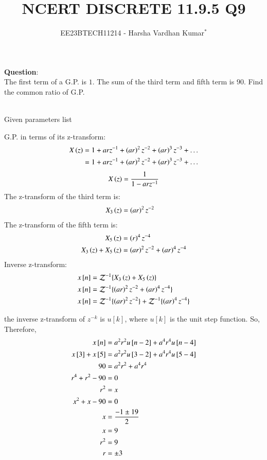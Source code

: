 \documentclass[journal,12pt,twocolumn]{IEEEtran}
\theoremstyle{remark}
\begin{document}

\vspace{3cm}
\title{NCERT DISCRETE 11.9.5 Q9}
\author{EE23BTECH11214 - Harsha Vardhan Kumar$^{*}$%
}
\maketitle
\newpage
\bigskip
\textbf{Question}:\\
The first term of a G.P. is $1$. The sum of the third term and fifth
term is $90$. Find the common ratio of G.P.
\\
\solution\\
\begin{table}[htbp]
\centering

\caption{Given parameters list}
\end{table}
G.P. in terms of its z-transform:
\begin{align}
X\left(z\right) &= 1 + arz^{-1} + \left(ar\right)^2z^{-2} + \left(ar\right)^3z^{-3} + \ldots \\
&= 1 + arz^{-1} + \left(ar\right)^2z^{-2} + \left(ar\right)^3z^{-3} + \ldots
\end{align}
\begin{align}
    X\left(z\right) = \frac{1}{1 - arz^{-1}}
\end{align}
The z-transform of the third term is:
\begin{align}
    X_3\left(z\right) &= \left(ar\right)^2z^{-2}
\end{align}
The z-transform of the fifth term is:
\begin{align}
    X_5\left(z\right) &= \left(r\right)^4z^{-4} \\
    X_3\left(z\right) + X_5\left(z\right) &= \left(ar\right)^2z^{-2} + \left(ar\right)^4z^{-4}
\end{align}
Inverse z-transform:
\begin{align}
x{}\left[n\right] &= \mathcal{Z}^{-1}\{ X_3\left(z\right) + X_5\left(z\right)\} \\
x{}\left[n\right] &= \mathcal{Z}^{-1}\{ \left(ar\right)^2z^{-2} + \left(ar\right)^4z^{-4} \} \\
x{}\left[n\right] &= \mathcal{Z}^{-1}\{ \left(ar\right)^2z^{-2} \} + \mathcal{Z}^{-1}\{ \left(ar\right)^4z^{-4} \} 
\end{align}

the inverse z-transform of \(z^{-k}\) is \(u[k]\), where \(u[k]\) is the unit step function. So,
Therefore,
\begin{align}
x{}\left[n\right] &= a^2r^2u{}\left[n-2\right] + a^4r^4u{}\left[n-4\right] \\
x{}\left[3\right]+ x{}\left[5\right] &= a^2r^2u{}\left[3-2\right] + a^4r^4u{}\left[5-4\right] \\
90 &= a^2r^2 + a^4r^4 \\
r^4 + r^2 - 90 &= 0 \\
r^2 &= x \\
x^2 + x - 90 &= 0 \\
x &= \frac{{-1 \pm 19}}{2} \\
x &= 9 \\
r^2 &= 9 \\
r &= \pm 3
\end{align}
\end{document}
